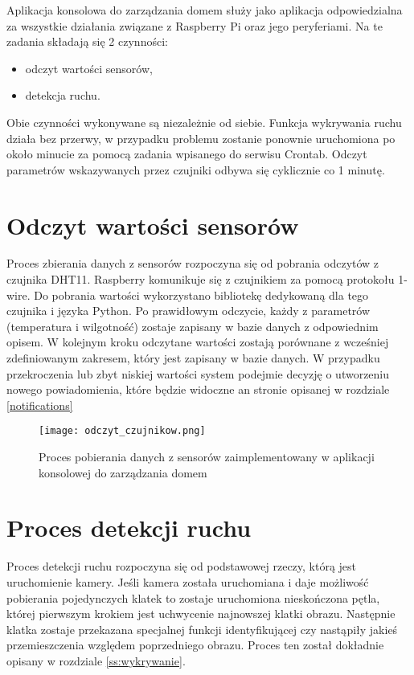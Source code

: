 Aplikacja konsolowa do zarządzania domem służy jako aplikacja odpowiedzialna za wszystkie działania związane z Raspberry Pi oraz jego peryferiami. Na te zadania składają się 2 czynności:
\begin{itemize}
\item odczyt wartości sensorów,
\item detekcja ruchu.
\end{itemize}
Obie czynności wykonywane są niezależnie od siebie. Funkcja wykrywania ruchu działa bez przerwy, w przypadku problemu zostanie ponownie uruchomiona po około minucie za pomocą zadania wpisanego do serwisu Crontab. Odczyt parametrów wskazywanych przez czujniki odbywa się cyklicznie co 1 minutę.

\section{Odczyt wartości sensorów}
Proces zbierania danych z sensorów rozpoczyna się od pobrania odczytów z czujnika DHT11. Raspberry komunikuje się z czujnikiem za pomocą protokołu 1-wire. Do pobrania wartości wykorzystano bibliotekę dedykowaną dla tego czujnika i języka Python. Po prawidłowym odczycie, każdy z parametrów (temperatura i wilgotność) zostaje zapisany w bazie danych z odpowiednim opisem. W kolejnym kroku odczytane wartości zostają porównane z wcześniej zdefiniowanym zakresem, który jest zapisany w bazie danych. W przypadku przekroczenia lub zbyt niskiej wartości system podejmie decyzję o utworzeniu nowego powiadomienia, które będzie widoczne an stronie opisanej w rozdziale \ref{notifications}
\begin{figure}[H]
	\centering
	\texttt{[image: odczyt\_czujnikow.png]}
	\caption{Proces pobierania danych z sensorów zaimplementowany w aplikacji konsolowej do zarządzania domem}
	\label{fig:odczyt_sensorow}
\end{figure}

\section{Proces detekcji ruchu}
Proces detekcji ruchu rozpoczyna się od podstawowej rzeczy, którą jest uruchomienie kamery. Jeśli kamera została uruchomiana i daje możliwość pobierania pojedynczych klatek to zostaje uruchomiona nieskończona pętla, której pierwszym krokiem jest uchwycenie najnowszej klatki obrazu. Następnie klatka zostaje przekazana specjalnej funkcji identyfikującej czy nastąpiły jakieś przemieszczenia względem poprzedniego obrazu. Proces ten został dokładnie opisany w rozdziale \ref{ss:wykrywanie}.

